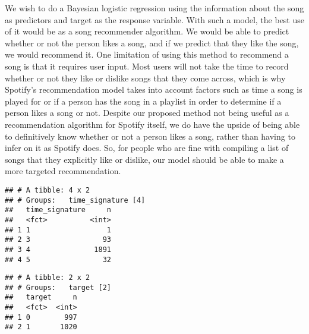 \documentclass[
]{article}
\begin{document}
We wish to do a Bayesian logistic regression using the information about
the song as predictors and target as the response variable. With such a
model, the best use of it would be as a song recommender algorithm. We
would be able to predict whether or not the person likes a song, and if
we predict that they like the song, we would recommend it. One
limitation of using this method to recommend a song is that it requires
user input. Most users will not take the time to record whether or not
they like or dislike songs that they come across, which is why Spotify's
recommendation model takes into account factors such as time a song is
played for or if a person has the song in a playlist in order to
determine if a person likes a song or not. Despite our proposed method
not being useful as a recommendation algorithm for Spotify itself, we do
have the upside of being able to definitively know whether or not a
person likes a song, rather than having to infer on it as Spotify does.
So, for people who are fine with compiling a list of songs that they
explicitly like or dislike, our model should be able to make a more
targeted recommendation.

\begin{verbatim}
## # A tibble: 4 x 2
## # Groups:   time_signature [4]
##   time_signature     n
##   <fct>          <int>
## 1 1                  1
## 2 3                 93
## 3 4               1891
## 4 5                 32
\end{verbatim}

\begin{verbatim}
## # A tibble: 2 x 2
## # Groups:   target [2]
##   target     n
##   <fct>  <int>
## 1 0        997
## 2 1       1020
\end{verbatim}
\end{document}
